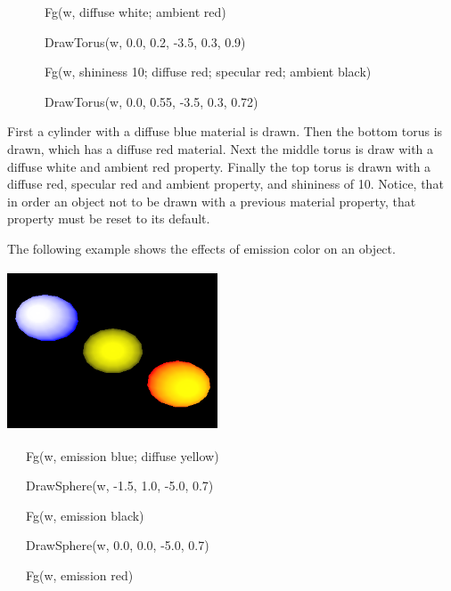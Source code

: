 \documentclass[letterpaper]{article}
\begin{document}
{{\sffamily
\ \ \ \ \ \ Fg(w, {\textquotedbl}diffuse white; ambient red{\textquotedbl})}

{\sffamily
\ \ \ \ \ \ DrawTorus(w, 0.0, 0.2, -3.5, 0.3, 0.9)}

{\sffamily
\ \ \ \ \ \ Fg(w, {\textquotedbl}shininess 10; diffuse red; specular red; ambient black{\textquotedbl})}

{\sffamily
\ \ \ \ \ \ DrawTorus(w, 0.0, 0.55, -3.5, 0.3, 0.72)}


\bigskip

{
First a cylinder with a diffuse blue material is drawn. Then the bottom torus is drawn, which has a diffuse red
material. Next the middle torus is draw with a diffuse white and ambient red property. Finally the top torus is drawn
with a diffuse red, specular red and ambient property, and shininess of 10. Notice, that in order an object not to be
drawn with a previous material property, that property must be reset to its default. }

{
The following example shows the effects of emission color on an object. }


\bigskip

{\centering  \includegraphics[width=2.4598in,height=1.8799in]{utr9/utr9-img025.png} \par}

\bigskip

{\sffamily
\ \ \ Fg(w, {\textquotedbl}emission blue; diffuse yellow{\textquotedbl}) }

{\sffamily
\ \ \ DrawSphere(w, -1.5, 1.0, -5.0, 0.7)}

{\sffamily
\ \ \ Fg(w, {\textquotedbl}emission black{\textquotedbl})}

{\sffamily
\ \ \ DrawSphere(w, 0.0, 0.0, -5.0, 0.7)}

{\sffamily
\ \ \ Fg(w, {\textquotedbl}emission red{\textquotedbl})}

}
\end{document}
